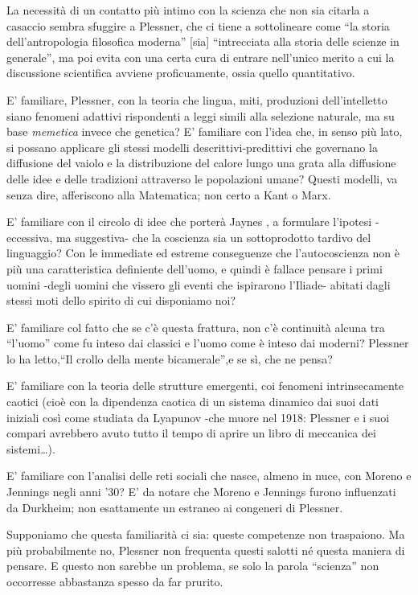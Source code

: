 \documentclass[dvipsnames]{amsart}
\begin{document}
La necessità di un contatto più intimo con la scienza che non sia citarla a casaccio sembra sfuggire a Plessner, che ci tiene a sottolineare come ``la storia dell'antropologia filosofica moderna'' [sia] ``intrecciata alla storia delle scienze in generale'', ma poi evita con una certa cura di entrare nell'unico merito a cui la discussione scientifica avviene proficuamente, ossia quello quantitativo.

E' familiare, Plessner, con la teoria che lingua, miti, produzioni dell'intelletto siano fenomeni adattivi rispondenti a leggi simili alla selezione naturale, ma su base \emph{memetica} invece che genetica? E' familiare con l'idea che, in senso più lato, si possano applicare gli stessi modelli descrittivi\hyp{}predittivi che governano la diffusione del vaiolo e la distribuzione del calore lungo una grata alla diffusione delle idee e delle tradizioni attraverso le popolazioni umane? Questi modelli, va senza dire, afferiscono alla Matematica; non certo a Kant o Marx.

E' familiare con il circolo di idee che porterà Jaynes \cite{jaynes2000origin}, a formulare l'ipotesi -eccessiva, ma suggestiva- che la coscienza sia un sottoprodotto tardivo del linguaggio? Con le immediate ed estreme conseguenze che l'autocoscienza non è più una caratteristica definiente dell'uomo, e quindi è fallace pensare i primi uomini -degli uomini che vissero gli eventi che ispirarono l'Iliade- abitati dagli stessi moti dello spirito di cui disponiamo noi? 

E' familiare col fatto che se c'è questa frattura, non c'è continuità alcuna tra ``l'uomo'' come fu inteso dai classici e l'uomo come è inteso dai moderni? Plessner lo ha letto,``Il crollo della mente bicamerale'',e se sì, che ne pensa?

E' familiare con la teoria delle strutture emergenti, coi fenomeni intrinsecamente caotici (cioè con la dipendenza caotica di un sistema dinamico dai suoi dati iniziali così come studiata da Lyapunov -che muore nel 1918: Plessner e i suoi compari avrebbero avuto tutto il tempo di aprire un libro di meccanica dei sistemi\dots).

E' familiare con l'analisi delle reti sociali \cite{10.2307/2785588} che nasce, almeno in nuce, con Moreno e Jennings negli anni '30? E' da notare che Moreno e Jennings furono influenzati da Durkheim; non esattamente un estraneo ai congeneri di Plessner. 

Supponiamo che questa familiarità ci sia: queste competenze non traspaiono. Ma più probabilmente no, Plessner non frequenta questi salotti né questa maniera di pensare. E questo non sarebbe un problema, se solo la parola ``scienza'' non occorresse abbastanza spesso da far prurito. 
\end{document}
